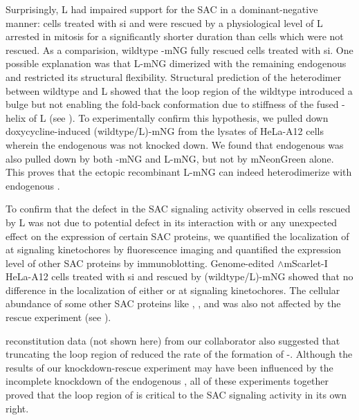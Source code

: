 Surprisingly, \textDelta{}L had impaired support for the SAC in a dominant-negative manner: cells treated with si and were rescued by a physiological level of \textDelta{}L arrested in mitosis for a significantly shorter duration than cells which were not rescued. As a comparision, wildtype -mNG fully rescued cells treated with si. One possible explanation was that \textDelta{}L-mNG dimerized with the remaining endogenous  and restricted its structural flexibility. Structural prediction of the heterodimer between wildtype  and \textDelta{}L showed that the loop region of the wildtype  introduced a bulge but not enabling the fold-back conformation due to stiffness of the fused \textalpha{}-helix of \textDelta{}L (see ). To experimentally confirm this hypothesis, we pulled down doxycycline-induced (wildtype/\textDelta{}L)-mNG from the lysates of HeLa-A12 cells wherein the endogenous  was not knocked down. We found that endogenous  was also pulled down by both -mNG and \textDelta{}L-mNG, but not by mNeonGreen alone. This proves that the ectopic recombinant \textDelta{}L-mNG can indeed heterodimerize with endogenous .

To confirm that the defect in the SAC signaling activity observed in cells rescued by \textDelta{}L was not due to potential defect in its interaction with  or any unexpected effect on the expression of certain SAC proteins, we quantified the localization of  at signaling kinetochores by fluorescence imaging and quantified the expression level of other SAC proteins by immunoblotting. Genome-edited $\wedge$mScarlet-I HeLa-A12 cells treated with si and rescued by (wildtype/\textDelta{}L)-mNG showed that no difference in the localization of either  or  at signaling kinetochores. The cellular abundance of some other SAC proteins like , , and  was also not affected by the rescue experiment (see ).

 reconstitution data (not shown here) from our collaborator also suggested that truncating the loop region of  reduced the rate of the formation of -. Although the results of our knockdown-rescue experiment may have been influenced by the incomplete knockdown of the endogenous , all of these experiments together proved that the loop region of  is critical to the SAC signaling activity in its own right.


